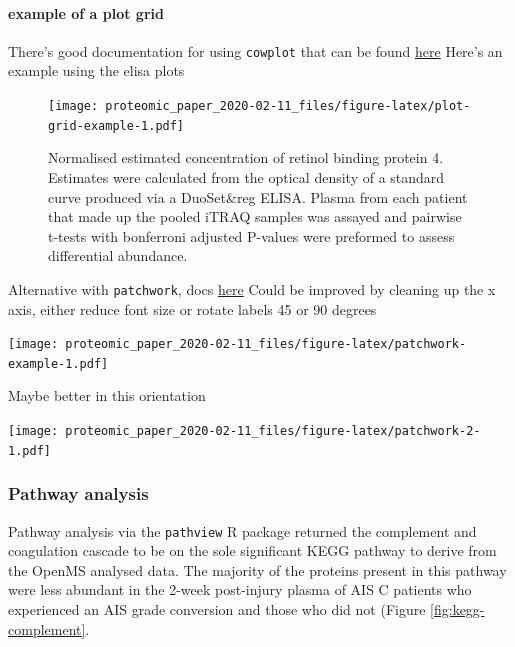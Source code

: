 \documentclass[9pt,lineno]{elife}
\begin{document}
\hypertarget{example-of-a-plot-grid}{%
\paragraph{example of a plot grid}\label{example-of-a-plot-grid}}

There's good documentation for using \texttt{cowplot} that can be found \href{https://wilkelab.org/cowplot/articles/plot_grid.html}{here}
Here's an example using the elisa plots



\begin{figure}
\centering
\texttt{[image: proteomic\_paper\_2020-02-11\_files/figure-latex/plot-grid-example-1.pdf]}
\caption{\label{fig:plot-grid-example}Normalised estimated concentration of retinol binding protein 4. Estimates were calculated from the optical density of a standard curve produced via a DuoSet\&reg ELISA. Plasma from each patient that made up the pooled iTRAQ samples was assayed and pairwise t-tests with bonferroni adjusted P-values were preformed to assess differential abundance.}
\end{figure}

Alternative with \texttt{patchwork}, docs \href{https://patchwork.data-imaginist.com/index.html}{here}
Could be improved by cleaning up the x axis, either reduce font size or rotate labels 45 or 90 degrees

\texttt{[image: proteomic\_paper\_2020-02-11\_files/figure-latex/patchwork-example-1.pdf]}

Maybe better in this orientation

\texttt{[image: proteomic\_paper\_2020-02-11\_files/figure-latex/patchwork-2-1.pdf]}

\hypertarget{kegg-chap3}{%
\subsubsection{Pathway analysis}\label{kegg-chap3}}

Pathway analysis via the \texttt{pathview} R package returned the complement and coagulation cascade to be on the sole significant KEGG pathway to derive from the OpenMS analysed data.
The majority of the proteins present in this pathway were less abundant in the 2-week post-injury plasma of AIS C patients who experienced an AIS grade conversion and those who did not (Figure \ref{fig:kegg-complement}.
\end{document}

